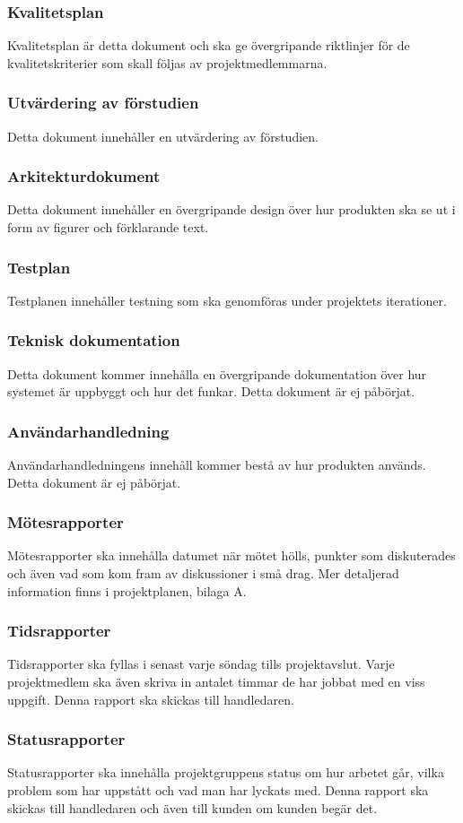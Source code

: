 \subsubsection{Kvalitetsplan}
Kvalitetsplan är detta dokument och ska ge övergripande riktlinjer för de kvalitetskriterier som skall följas av projektmedlemmarna.

\subsubsection{Utvärdering av förstudien}
Detta dokument innehåller en utvärdering av förstudien.

\subsubsection{Arkitekturdokument}
Detta dokument innehåller en övergripande design över hur produkten ska se ut i form av figurer och förklarande text.

\subsubsection{Testplan}
Testplanen innehåller testning som ska genomföras under projektets iterationer.

\subsubsection{Teknisk dokumentation}
Detta dokument kommer innehålla en övergripande dokumentation över hur systemet är uppbyggt och hur det funkar. Detta dokument är ej påbörjat. 

\subsubsection{Användarhandledning}
Användarhandledningens innehåll kommer bestå av hur produkten används. Detta dokument är ej påbörjat.

\subsubsection{Mötesrapporter}
Mötesrapporter ska innehålla datumet när mötet hölls, punkter som diskuterades och även vad som kom fram av diskussioner i små drag. Mer detaljerad information finns i projektplanen, bilaga A.

\subsubsection{Tidsrapporter}
Tidsrapporter ska fyllas i senast varje söndag tills projektavslut. Varje projektmedlem ska även skriva in antalet timmar de har jobbat med en viss uppgift. Denna rapport ska skickas till handledaren.

\subsubsection{Statusrapporter}
Statusrapporter ska innehålla projektgruppens status om hur arbetet går, vilka problem som har uppstått och vad man har lyckats med. Denna rapport ska skickas till handledaren och även till kunden om kunden begär det. 
